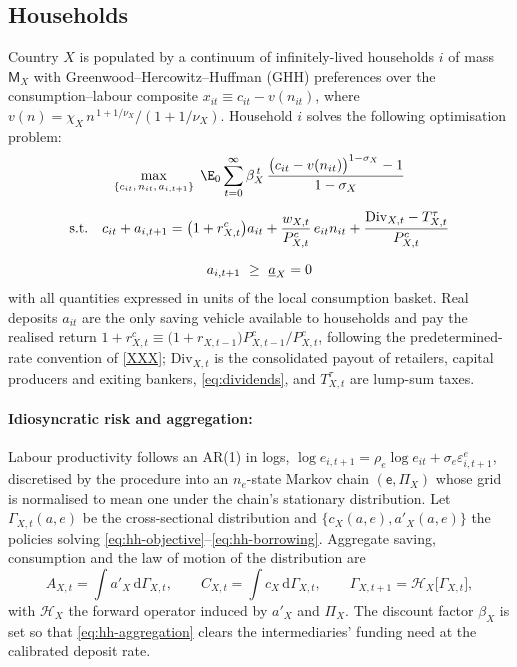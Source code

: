 \subsection{Households}
\label{sec:Households}
Country $X$ is populated by a continuum of infinitely-lived households $i$ of mass $\mathsf{M}_X$
with Greenwood--Hercowitz--Huffman (GHH) preferences over the consumption--labour
composite $x_{it}\equiv c_{it}-v(n_{it})$, where
$v(n)=\chi_X\,n^{\,1+1/\nu_X}/(1+1/\nu_X)$. Household $i$ solves the following optimisation problem:
\begin{gather}
  \max_{\{c_{it},\,n_{it},\,a_{i,t+1}\}}\;
    \E_0\sum_{t=0}^{\infty}\beta_X^{\,t}\,
    \frac{\bigl(c_{it}-v(n_{it})\bigr)^{1-\sigma_X}-1}{1-\sigma_X}
    \label{eq:hh-objective}\\[6pt]
  \text{s.t.}\quad
    c_{it}+a_{i,t+1}
    =\bigl(1+r^{c}_{X,t}\bigr)a_{it}
    +\frac{w_{X,t}}{P^{c}_{X,t}}\,e_{it}n_{it}
    +\frac{\mathrm{Div}_{X,t}-T^{\tau}_{X,t}}{P^{c}_{X,t}}
    \label{eq:hh-budget}\\[6pt]
  a_{i,t+1}\ \ge\ \underline{a}_X=0
    \label{eq:hh-borrowing}
\end{gather}
with all quantities expressed in units of the local consumption basket. Real
deposits $a_{it}$ are the only saving vehicle available to households and pay the
realised return
$1+r^{c}_{X,t}\equiv\bigl(1+r_{X,t-1}\bigr)P^{c}_{X,t-1}/P^{c}_{X,t}$, following
the predetermined-rate convention of \cref{XXX}; %
$\mathrm{Div}_{X,t}$ is the consolidated payout of retailers, capital producers
and exiting bankers, \eqref{eq:dividends}, and $T^{\tau}_{X,t}$ are lump-sum
taxes.

\paragraph{Idiosyncratic risk and aggregation:}
Labour productivity follows an AR(1) in logs,
$\log e_{i,t+1}=\rho_{e}\log e_{it}+\sigma_{e}\varepsilon^{e}_{i,t+1}$,
discretised by the \citet{rouwenhorst1995} procedure into an $n_e$-state Markov
chain $(\mathsf{e},\Pi_X)$ whose grid is normalised to mean one under the chain's
stationary distribution. Let $\Gamma_{X,t}(a,e)$ be the cross-sectional
distribution and $\{c_X(a,e),a'_X(a,e)\}$ the policies solving
\eqref{eq:hh-objective}--\eqref{eq:hh-borrowing}. Aggregate saving, consumption
and the law of motion of the distribution are
\begin{equation}
A_{X,t}=\int a'_X\,\mathrm{d}\Gamma_{X,t},
\qquad
C_{X,t}=\int c_X\,\mathrm{d}\Gamma_{X,t},
\qquad
\Gamma_{X,t+1}=\mathcal{H}_X\bigl[\Gamma_{X,t}\bigr],
\label{eq:hh-aggregation}
\end{equation}
with $\mathcal{H}_X$ the forward operator induced by $a'_X$ and $\Pi_X$. The
discount factor $\beta_X$ is set so that \eqref{eq:hh-aggregation} clears the
intermediaries' funding need at the calibrated deposit rate.

